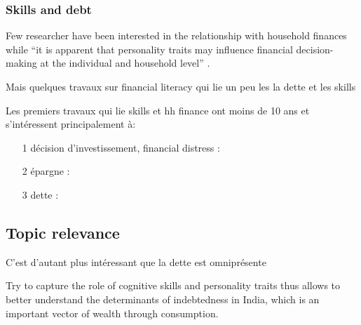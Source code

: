 \documentclass[a4paper, 11pt, onecolumn]{article}
\begin{document}
		\subsubsection{Skills and debt}


Few researcher have been interested in the relationship with household finances while ``it is apparent that personality traits may influence financial decision-making at the individual and household level'' \citep{Brown2014}.

Mais quelques travaux sur financial literacy qui lie un peu les la dette et les skills \citep{Hastings2013} \citep{Varum2014} \citep{Pinjisakikool2017} \citep{Gaurav2012} \citep{Hastings2013} 

Les premiers travaux qui lie skills et hh finance ont moins de 10 ans et s'intéressent principalement à:
\begin{itemize}
\item[1] décision d'investissement, financial distress : \citep{Nga2013} \citep{Pinjisakikool2017b} \citep{Bucciol2017} \citep{Agarwal2013} \citep{Parise2019}
\item[2] épargne  : \citep{CobbClark2016} \citep{Gerhard2018}
\item[3] dette : \citep{Forlicz2019} \citep{Silva2018} \citep{Brown2014}
\end{itemize}









	\subsection{Topic relevance}



C'est d'autant plus intéressant que la dette est omniprésente \cite{Guerin2013, Guerin2020}

Try to capture the role of cognitive skills and personality traits thus allows to better understand the determinants of indebtedness in India, which is an important vector of wealth through consumption. 
\end{document}
